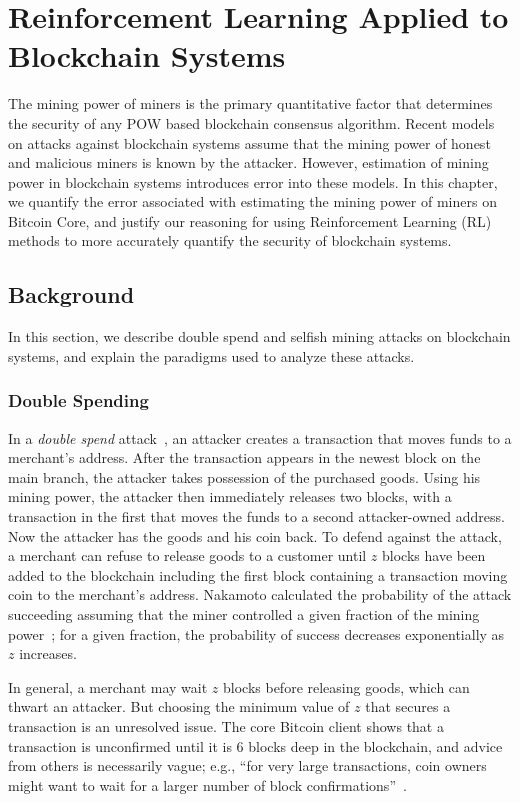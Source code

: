 \chapter{Reinforcement Learning Applied to Blockchain Systems}\label{selfishRL}
The mining power of miners is the primary quantitative factor that determines the security of any POW based blockchain consensus algorithm. Recent models~\cite{eyal:2014, sapirshtein:2015, Gervais:2016} on attacks against blockchain systems assume that the mining power of honest and malicious miners is known by the attacker. However, estimation of mining power in blockchain systems introduces error into these models. In this chapter, we quantify the error associated with estimating the mining power of miners on Bitcoin Core, and justify our reasoning for using Reinforcement Learning (RL) methods to more accurately quantify the security of blockchain systems.

\section{Background}
In this section, we describe double spend and selfish mining attacks on blockchain systems, and explain the paradigms used to analyze these attacks.

\subsection{Double Spending} 
In a {\em double spend} attack~\cite{Nakamoto:2009}, an attacker creates a transaction that moves
funds to a merchant's address. After the transaction appears in the
newest block on the main branch, the attacker takes possession of the purchased
goods. Using his mining power, the attacker then immediately releases
two blocks, with a transaction in the first that moves the funds to a
second attacker-owned address. Now the attacker has the goods and his
coin back. To defend against the attack, a merchant can refuse to
release goods to a customer until $z$ blocks have been
added to the blockchain including the first block containing a
transaction moving coin to the merchant's address.  Nakamoto
calculated the probability of the attack succeeding assuming that the
miner controlled a given fraction of the mining power~\cite{Nakamoto:2009};
for a given fraction, the probability of success decreases exponentially as $z$
increases. 

In general, a merchant may wait $z$ blocks before releasing goods,
which can thwart an attacker.
But choosing the minimum value of $z$ that secures a transaction is an
unresolved issue. The core Bitcoin client shows that a transaction is
unconfirmed until it is 6 blocks deep in the
blockchain\cite{bitcoin:confirmation}, and   advice from others is necessarily vague; e.g., ``for very large transactions, coin
owners might want to wait for a larger number of block
confirmations''~\cite{Bonneau:2015a}.   

